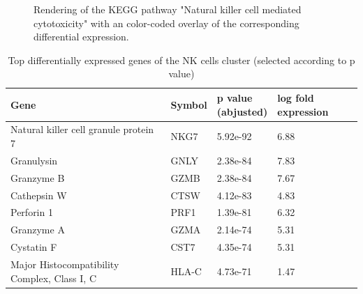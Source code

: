 \documentclass[11pt,a4paper]{article}
\begin{document}
\begin{figure}

    \caption{Rendering of the KEGG pathway "Natural killer cell mediated cytotoxicity" with an color-coded overlay of
    the corresponding differential expression.}
\end{figure}



\begin{table}
    \begin{tabular}{ | l | l | l | l |}
    \hline
    \rowcolor{Gainsboro!60}

    Gene & Symbol & \makecell{p value \\ (abjusted)} & log fold expression  \\ \hline
    Natural killer cell granule protein 7 & NKG7 & 5.92e-92 & 6.88 \\ \hline
    Granulysin & GNLY & 2.38e-84 & 7.83  \\ \hline
    Granzyme B & GZMB & 2.38e-84 & 7.67 \\ \hline
    Cathepsin W & CTSW & 4.12e-83 & 4.83 \\ \hline
    Perforin 1 & PRF1 & 1.39e-81 & 6.32 \\ \hline
    Granzyme A & GZMA & 2.14e-74 & 5.31 \\ \hline
    Cystatin F & CST7 & 4.35e-74 & 5.31 \\ \hline
    Major Histocompatibility Complex, Class I, C & HLA-C & 4.73e-71 & 1.47 \\ \hline

    \end{tabular}

    \caption{Top differentially expressed genes of the NK cells cluster (selected according to p value)}
\end{table}
\end{document}

